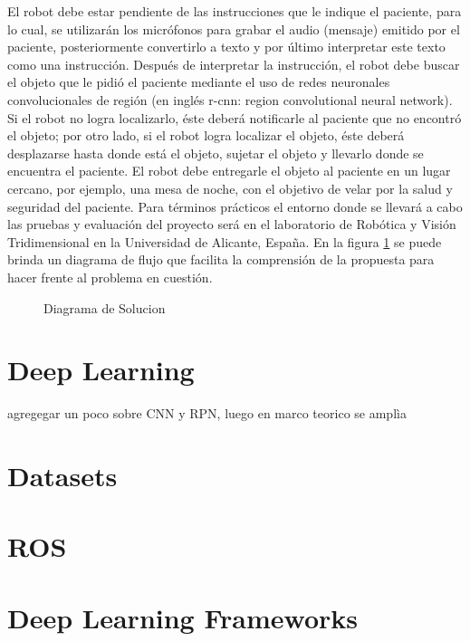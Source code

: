 El robot debe estar pendiente de las instrucciones que le indique el paciente, para lo cual, se utilizarán los micrófonos
para grabar el audio (mensaje) emitido por el paciente, posteriormente convertirlo a texto y por último interpretar este
texto como una instrucción. Después de interpretar la instrucción, el robot debe buscar el objeto que le pidió el paciente
mediante el uso de redes neuronales convolucionales de región (en inglés r-cnn: region convolutional neural network).
Si el robot no logra localizarlo, éste deberá notificarle al paciente que no encontró el objeto; por otro lado, si el robot
logra localizar el objeto, éste deberá desplazarse hasta donde está el objeto, sujetar el objeto y llevarlo donde se encuentra
el paciente. El robot debe entregarle el objeto al paciente  en un lugar cercano, por ejemplo, una mesa de noche, con el 
objetivo de velar por la salud y seguridad del paciente. Para términos prácticos el entorno donde se llevará a cabo las 
pruebas y evaluación del proyecto será en el laboratorio de Robótica y Visión Tridimensional en la Universidad de Alicante, España. 
En la figura \ref{fig:DiagramaDeSolucion} se puede brinda un diagrama de flujo que facilita la comprensión de la propuesta para 
hacer frente al problema en cuestión. 



\begin{figure}
	\centering
	
	\caption{Diagrama de Solucion} \label{fig:DiagramaDeSolucion} 
\end{figure}

\newpage





\section{Deep Learning}
agregegar un poco sobre CNN y RPN, luego en marco teorico se amplìa


\section{Datasets}


\section{ROS}



\section{Deep Learning Frameworks}




